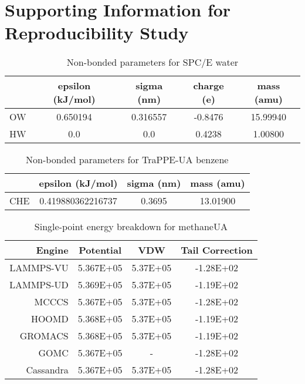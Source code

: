 \chapter{Supporting Information for Reproducibility Study}
\label{chap:rep_SI}

\newpage %


\begin{table}
\caption{Non-bonded parameters for SPC/E water} \label{tab:water}
\centering
\begin{tabular}{lcccc}
   & epsilon (kJ/mol) & sigma (nm) & charge (e) & mass (amu) \\ \hline
OW & 0.650194         & 0.316557   & -0.8476    &  15.99940  \\ 
HW & 0.0              & 0.0        &  0.4238    &  1.00800   \\ \hline
\end{tabular}
\end{table}

\begin{table}
\caption{Non-bonded parameters for TraPPE-UA benzene} \label{tab:bz_nonbond}
\centering
\begin{tabular}{lccc}
    & epsilon (kJ/mol)  & sigma (nm) & mass (amu) \\ \hline
CHE & 0.419880362216737 & 0.3695     &  13.01900  \\ \hline
\end{tabular}
\end{table}


\begin{table}
\caption{Single-point energy breakdown for methaneUA}\label{tab:sp_methane}
\centering
\begin{tabular}{rccc}
Engine & Potential & VDW & Tail Correction \\ \hline
LAMMPS-VU & 5.367E+05 & 5.37E+05 & -1.28E+02 \\
LAMMPS-UD & 5.369E+05 & 5.37E+05 & -1.19E+02 \\
MCCCS & 5.367E+05 & 5.37E+05 & -1.28E+02 \\
HOOMD & 5.368E+05 & 5.37E+05 & -1.19E+02 \\
GROMACS & 5.368E+05 & 5.37E+05 & -1.19E+02 \\
GOMC & 5.367E+05 & - & -1.28E+02 \\
Cassandra & 5.367E+05 & 5.37E+05 & -1.28E+02 \\ \hline
\end{tabular}
\end{table}

